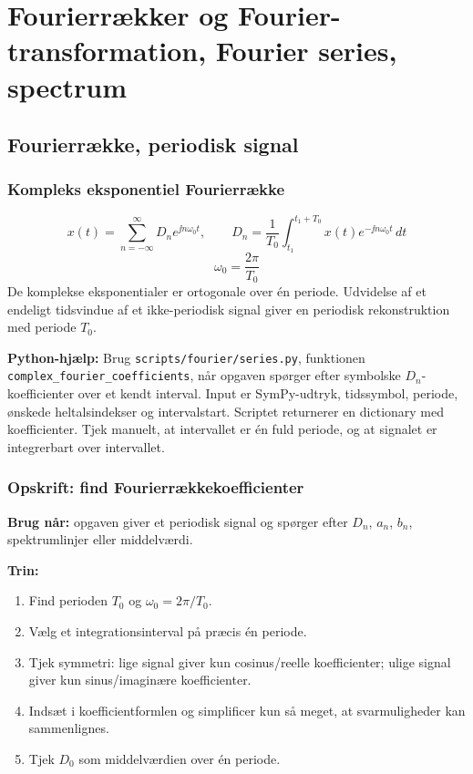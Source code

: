 \section{Fourierrækker og Fourier-transformation, Fourier series, spectrum}

\subsection{Fourierrække, periodisk signal}

\subsubsection{Kompleks eksponentiel Fourierrække}
\[
x(t)=\sum_{n=-\infty}^{\infty}D_n e^{\jj n\omega_0t},\qquad
D_n=\frac{1}{T_0}\int_{t_1}^{t_1+T_0}x(t)e^{-\jj n\omega_0t}\,dt
\]
\[
\omega_0=\frac{2\pi}{T_0}
\]
De komplekse eksponentialer er ortogonale over én periode. Udvidelse af et endeligt tidsvindue af et ikke-periodisk signal giver en periodisk rekonstruktion med periode \(T_0\).

\textbf{Python-hjælp:} Brug \texttt{scripts/fourier/series.py}, funktionen \texttt{complex\_fourier\_coefficients}, når opgaven spørger efter symbolske \(D_n\)-koefficienter over et kendt interval. Input er SymPy-udtryk, tidssymbol, periode, ønskede heltalsindekser og intervalstart. Scriptet returnerer en dictionary med koefficienter. Tjek manuelt, at intervallet er én fuld periode, og at signalet er integrerbart over intervallet.

\subsubsection{Opskrift: find Fourierrækkekoefficienter}
\textbf{Brug når:} opgaven giver et periodisk signal og spørger efter \(D_n\), \(a_n\), \(b_n\), spektrumlinjer eller middelværdi.

\textbf{Trin:}
\begin{enumerate}
    \item Find perioden \(T_0\) og \(\omega_0=2\pi/T_0\).
    \item Vælg et integrationsinterval på præcis én periode.
    \item Tjek symmetri: lige signal giver kun cosinus/reelle koefficienter; ulige signal giver kun sinus/imaginære koefficienter.
    \item Indsæt i koefficientformlen og simplificer kun så meget, at svarmuligheder kan sammenlignes.
    \item Tjek \(D_0\) som middelværdien over én periode.
\end{enumerate}

